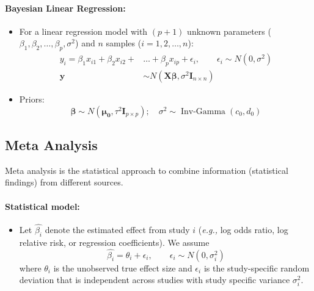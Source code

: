 \documentclass{article}
\begin{document}
\paragraph{Bayesian Linear Regression:}
\begin{itemize}
    \item For a linear regression model with $(p+1)$ unknown parameters ($\beta_1, \beta_2, \ldots, \beta_p, \sigma^2$) and $n$ samples ($i=1,2,\ldots, n$):
        \begin{align}
            y_i=\beta_1x_{i1}+\beta_2x_{i2}+&\ldots+\beta_px_{ip}+\epsilon_i, \qquad \epsilon_i\sim N(0,\sigma^2) \\
            \mathbf{y}&\sim N(\bm{X\beta}, \sigma^2\mathbf{I}_{n\times n})
        \end{align}
    \item Priors:
        \begin{equation}
            \bm{\beta}\sim N(\bm{\mu_0}, \tau^2\mathbf{I}_{p\times p}); \quad \sigma^2\sim \operatorname{Inv-Gamma}(c_0,d_0)
        \end{equation}
\end{itemize}


\subsection{Meta Analysis}

Meta analysis is the statistical approach to combine information (statistical findings) from different sources.

\paragraph{Statistical model:}
\begin{itemize}
    \item Let $\hat{\beta_i}$ denote the estimated effect from study $i$ (\textit{e.g.,} log odds ratio, log relative risk, or regression coefficients). We assume
        \begin{equation}
            \hat{\beta_i}=\theta_i+\epsilon_i, \qquad \epsilon_i\sim N(0, \sigma^2_i)
        \end{equation}
        where $\theta_i$ is the unobserved true effect size and $\epsilon_i$ is the study-specific random deviation that is independent across studies with study specific variance $\sigma^2_i$.
\end{itemize}
\end{document}
